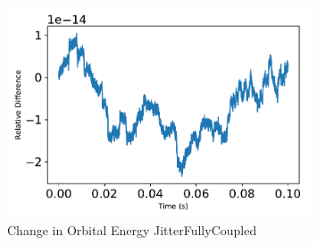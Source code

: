 \begin{figure}[htbp]\centerline{\includegraphics[width=0.8\textwidth]{AutoTeX/ChangeInOrbitalEnergyJitterFullyCoupled}}\caption{Change in Orbital Energy JitterFullyCoupled}\label{fig:ChangeInOrbitalEnergyJitterFullyCoupled}\end{figure}